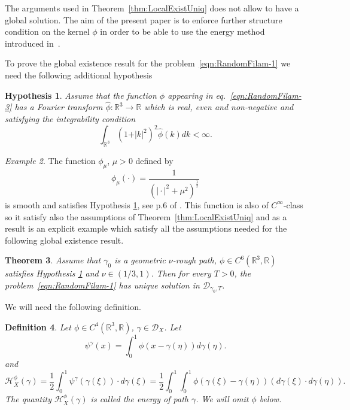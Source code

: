\documentclass[11pt,a4paper,reqno]{amsart}%
\newcommand\half{\frac12}
\theoremstyle{plain}
\newtheorem{theorem}{Theorem}[section]
\theoremstyle{remark}
\newtheorem{example}[theorem]{Example}
\theoremstyle{plain}
\newtheorem{definition}[theorem]{Definition}
\newtheorem{hypothesis}[theorem]{Hypothesis}
\numberwithin{equation}{section}
\def\Rnu{{\mathbb R}}
\begin{document}
The arguments used in Theorem~\ref{thm:LocalExistUniq} does not allow to have a global solution. The aim of the present paper is to enforce further structure condition on the kernel $\phi$ in order to be able to use the energy method introduced in~\cite{[Bers+Gub_2007]}.


To prove the  global existence result for the problem~\eqref{eqn:RandomFilam-1} we need the following additional hypothesis
\begin{hypothesis}\label{hyp:PhiAssumptions}
 Assume that the function $\phi$ appearing in eq.~\eqref{eqn:RandomFilam-3} has a Fourier transform $\hat\phi:\Rnu^3\to\Rnu$ which is real, even and
non-negative and satisfying the integrability condition
$$
\int_{\Rnu^3}(1+\vert k\vert^2)^2\hat{\phi}(k)dk<\infty.
$$
\end{hypothesis}
\begin{example}
The function $\phi_\mu$, $\mu>0$ defined by
$$\phi_\mu(\cdot)=\frac{1}{(\vert \cdot\vert^2+\mu^2)^{\half}}$$
is smooth and satisfies Hypothesis \ref{hyp:PhiAssumptions}, see p.6
of \cite{[Bers+Gub_2007]}. This function is also of $C^\infty$-class  so it satisfy also the assumptions of Theorem~\ref{thm:LocalExistUniq} and as a result is an explicit example which satisfy all the assumptions needed for the following global existence result.
\end{example}
\begin{theorem}\label{thm:GlobalExistUniq}
Assume that  $\gamma_0$ is a geometric $\nu$-rough path, $\phi\in
C^6(\Rnu^3,\Rnu)$ satisfies   Hypothesis
\ref{hyp:PhiAssumptions} and  $\nu\in({1}/{3},1)$. Then for every $T>0$, the problem~\eqref{eqn:RandomFilam-1} has unique
solution in $\mathcal{D}_{\gamma_0,T}$.
\end{theorem}
We will need the following definition.
\begin{definition}
Let $\phi\in C^4(\Rnu^3,\Rnu)$, $\gamma\in \mathcal{D}_X$. Let
\begin{equation*}
\psi^{\gamma}(x)=\int_0^1\phi(x-\gamma(\eta))d\gamma(\eta).\label{eqn:EnergyIntegralDef-1a}
\end{equation*}
and
\begin{equation}
\mathcal{H}_X^{\phi}(\gamma)=\frac{1}{2}\int_0^1\psi^{\gamma}(\gamma(\xi))\cdot
d\gamma(\xi) = \frac{1}{2}\int_0^1 \int_0^1 \phi(\gamma(\xi)-\gamma(\eta))
(d\gamma(\xi)\cdot d\gamma(\eta)).
\label{eqn:EnergyIntegralDef-1}
\end{equation}
The quantity
$\mathcal{H}_X^{\phi}(\gamma)$ is called the energy of path $\gamma$. We will omit $\phi$ below.
\end{definition}
\end{document}
